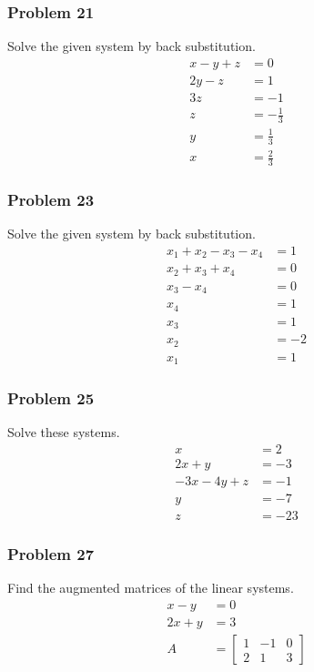 \documentclass[letterpaper, 12pt]{math}
\begin{document}
\subsubsection*{Problem 21}
Solve the given system by back substitution.
\begin{align*}
  x-y+z &= 0 \\
  2y-z &= 1 \\
  3z &= -1 \\
  z &= -\frac{1}{3} \\
  y &= \frac{1}{3} \\
  x &= \frac{2}{3}
\end{align*}

\subsubsection*{Problem 23}
Solve the given system by back substitution.
\begin{align*}
  x_1+x_2-x_3-x_4 &= 1 \\
  x_2+x_3+x_4 &= 0 \\
  x_3-x_4 &= 0 \\
  x_4 &= 1 \\
  x_3 &= 1 \\
  x_2 &= -2 \\
  x_1 &= 1
\end{align*}

\subsubsection*{Problem 25}
Solve these systems.
\begin{align*}
  x &= 2 \\
  2x+y &= -3 \\
  -3x-4y+z &= -1 \\
  y &= -7 \\
  z &= -23
\end{align*}

\subsubsection*{Problem 27}
Find the augmented matrices of the linear systems.
\begin{align*}
  x-y &= 0 \\
  2x+y &= 3 \\
  A &= \left[\begin{array}{cc|c}
    1 & -1 & 0 \\
    2 & 1 & 3
  \end{array}\right]
\end{align*}
\end{document}

